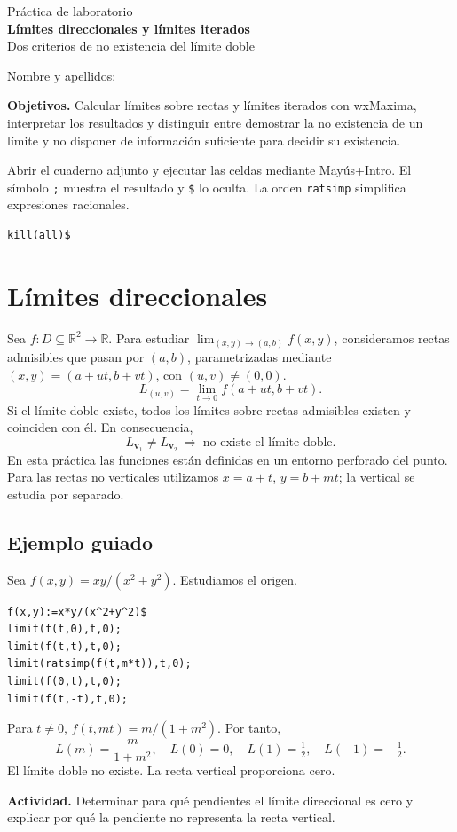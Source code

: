 \documentclass[12pt,a4paper]{article}
\newcommand{\limdob}{\lim_{(x,y)\to(a,b)}}
\begin{document}
\begin{center}
{\large Práctica de laboratorio}\\[5pt]
{\LARGE\bfseries\color{azul} Límites direccionales y límites iterados}\\[5pt]
{\large Dos criterios de no existencia del límite doble}
\end{center}
\noindent Nombre y apellidos: \hrulefill\par\medskip
\noindent\textbf{Objetivos.} Calcular límites sobre rectas y límites iterados con wxMaxima, interpretar los resultados y distinguir entre demostrar la no existencia de un límite y no disponer de información suficiente para decidir su existencia.

\noindent Abrir el cuaderno adjunto y ejecutar las celdas mediante Mayús+Intro. El símbolo \texttt{;} muestra el resultado y \texttt{\$} lo oculta. La orden \texttt{ratsimp} simplifica expresiones racionales.
\begin{lstlisting}
kill(all)$
\end{lstlisting}
\section{Límites direccionales}
Sea $f:D\subseteq\mathbb R^2\to\mathbb R$. Para estudiar $\limdob f(x,y)$, consideramos rectas admisibles que pasan por $(a,b)$, parametrizadas mediante $(x,y)=(a+ut,b+vt)$, con $(u,v)\ne(0,0)$.
\[
L_{(u,v)}=\lim_{t\to0}f(a+ut,b+vt).
\]
Si el límite doble existe, todos los límites sobre rectas admisibles existen y coinciden con él. En consecuencia,
\[\boxed{L_{\mathbf v_1}\ne L_{\mathbf v_2}\ \Longrightarrow\ \text{no existe el límite doble}.}\]
En esta práctica las funciones están definidas en un entorno perforado del punto. Para las rectas no verticales utilizamos $x=a+t$, $y=b+mt$; la vertical se estudia por separado.
\subsection*{Ejemplo guiado}
Sea $f(x,y)=xy/(x^2+y^2)$. Estudiamos el origen.
\begin{lstlisting}
f(x,y):=x*y/(x^2+y^2)$
limit(f(t,0),t,0);
limit(f(t,t),t,0);
limit(ratsimp(f(t,m*t)),t,0);
limit(f(0,t),t,0);
limit(f(t,-t),t,0);
\end{lstlisting}
Para $t\ne0$, $f(t,mt)=m/(1+m^2)$. Por tanto,
\[\boxed{L(m)=\frac{m}{1+m^2},\quad L(0)=0,\quad L(1)=\tfrac12,\quad L(-1)=-\tfrac12.}\]
El límite doble no existe. La recta vertical proporciona cero.
\begin{center}
\end{center}
\textbf{Actividad.} Determinar para qué pendientes el límite direccional es cero y explicar por qué la pendiente no representa la recta vertical.
\end{document}
